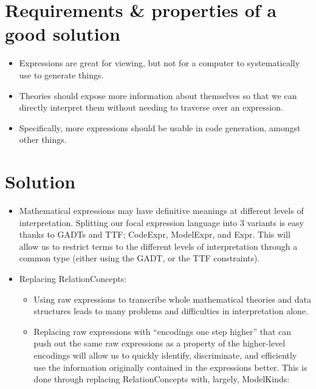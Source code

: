 \section{Requirements \& properties of a good solution}

\begin{itemize}

	\item Expressions are great for viewing, but not for a computer to
		  systematically use to generate things.

	\item Theories should expose more information about themselves so that
		  we can directly interpret them without needing to traverse over
		  an expression.

	\item Specifically, more expressions should be usable in code generation,
		  amongst other things.
	
\end{itemize}

\section{Solution}

\begin{itemize}

	\item Mathematical expressions may have definitive meanings
		  at different levels of interpretation. Splitting our
		  focal expression language into 3 variants is easy 
		  thanks to GADTs and TTF; CodeExpr, ModelExpr, and Expr.
		  This will allow us to restrict terms to the different
		  levels of interpretation through a common type (either
		  using the GADT, or the TTF constraints). 

	\item Replacing RelationConcepts:
	
		\begin{itemize}

			\item Using raw expressions to transcribe whole mathematical
				  theories and data structures leads to many problems
				  and difficulties in interpretation alone.
			
			\item Replacing raw expressions with ``encodings one step
				  higher'' that can push out the same raw expressions
				  as a property of the higher-level encodings will
				  allow us to quickly identify, discriminate, and efficiently
				  use the information originally contained in the expressions
				  better. This is done through replacing RelationConcepts
				  with, largely, ModelKinds:

		\end{itemize}

\end{itemize}


